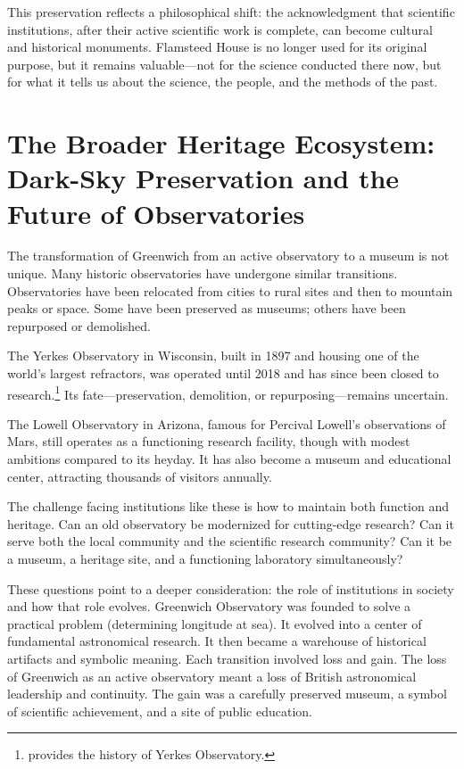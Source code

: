 This preservation reflects a philosophical shift: the acknowledgment that scientific institutions, after their active scientific work is complete, can become cultural and historical monuments. Flamsteed House is no longer used for its original purpose, but it remains valuable---not for the science conducted there now, but for what it tells us about the science, the people, and the methods of the past.

\section{The Broader Heritage Ecosystem: Dark-Sky Preservation and the Future of Observatories}

The transformation of Greenwich from an active observatory to a museum is not unique. Many historic observatories have undergone similar transitions. Observatories have been relocated from cities to rural sites and then to mountain peaks or space. Some have been preserved as museums; others have been repurposed or demolished.

The Yerkes Observatory in Wisconsin, built in 1897 and housing one of the world's largest refractors, was operated until 2018 and has since been closed to research.\footnote{\textcite{Osterbrock1997} provides the history of Yerkes Observatory.} Its fate---preservation, demolition, or repurposing---remains uncertain.

The Lowell Observatory in Arizona, famous for Percival Lowell's observations of Mars, still operates as a functioning research facility, though with modest ambitions compared to its heyday. It has also become a museum and educational center, attracting thousands of visitors annually.

The challenge facing institutions like these is how to maintain both function and heritage. Can an old observatory be modernized for cutting-edge research? Can it serve both the local community and the scientific research community? Can it be a museum, a heritage site, and a functioning laboratory simultaneously?

These questions point to a deeper consideration: the role of institutions in society and how that role evolves. Greenwich Observatory was founded to solve a practical problem (determining longitude at sea). It evolved into a center of fundamental astronomical research. It then became a warehouse of historical artifacts and symbolic meaning. Each transition involved loss and gain. The loss of Greenwich as an active observatory meant a loss of British astronomical leadership and continuity. The gain was a carefully preserved museum, a symbol of scientific achievement, and a site of public education.

